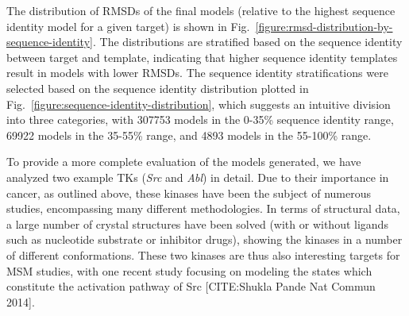 \documentclass[aps,pre,twocolumn,nofootinbib,superscriptaddress,linenumbers]{revtex4-1}
\begin{document}
The distribution of RMSDs of the final models (relative to the highest sequence identity model for a given target) is shown in Fig.~\ref{figure:rmsd-distribution-by-sequence-identity}.
The distributions are stratified based on the sequence identity between target and template, indicating that higher sequence identity templates result in models with lower RMSDs.
The sequence identity stratifications were selected based on the sequence identity distribution plotted in Fig.~\ref{figure:sequence-identity-distribution}, which suggests an intuitive division into three categories, with \num{307753} models in the 0-35\% sequence identity range, \num{69922} models in the 35-55\% range, and \num{4893} models in the 55-100\% range. 

To provide a more complete evaluation of the models generated, we have analyzed two example TKs (\emph{Src} and \emph{Abl}) in detail.
Due to their importance in cancer, as outlined above, these kinases have been the subject of numerous studies, encompassing many different methodologies.
In terms of structural data, a large number of crystal structures have been solved (with or without ligands such as nucleotide substrate or inhibitor drugs), showing the kinases in a number of different conformations.
These two kinases are thus also interesting targets for MSM studies, with one recent study focusing on modeling the states which constitute the activation pathway of Src {\color{blue}[CITE:Shukla Pande Nat Commun 2014]}.
\end{document}
